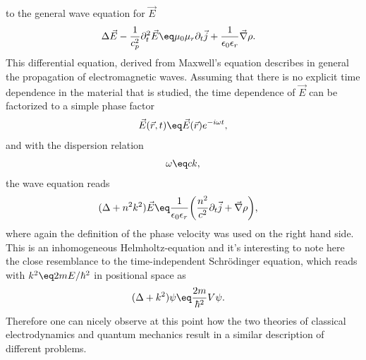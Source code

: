\documentclass[\main/dresen_thesis.tex]{subfiles}
\begin{document}
    to the general wave equation for $\vec{E}$
    \begin{align}
      \Delta \vec{E} - \frac{1}{c_p^2}\partial_t^2  \vec{E} \eq& \mu_0 \mu_r \partial_t \vec{j} + \frac{1}{\epsilon_0 \epsilon_r}\vec{\nabla} \rho.
    \end{align}
    This differential equation, derived from Maxwell's equation describes in general the propagation of electromagnetic waves.
    Assuming that there is no explicit time dependence in the material that is studied, the time dependence of $\vec{E}$ can be factorized to a simple phase factor
    \begin{align}
      \vec{E}(\vec{r}, t) \eq \vec{E} (\vec{r}) e^{-i\omega t},
    \end{align}
    and with the dispersion relation
    \begin{align}
      \omega \eq c k,
    \end{align}
    the wave equation reads
    \begin{align}
      (\Delta + n^2 k^2 )\vec{E} \eq& \frac{1}{\epsilon_0 \epsilon_r} \biggl(  \frac{n^2}{c^2} \partial_t \vec{j} + \vec{\nabla} \rho \biggr),
    \end{align}
    where again the definition of the phase velocity was used on the right hand side. This is an inhomogeneous Helmholtz-equation and it's interesting to note here the close resemblance to the time-independent Schr\"odinger equation, which reads with $k^2 \eq 2mE/\hbar^2$ in positional space as
    \begin{align}
      (\Delta + k^2 )\psi \eq& \frac{2m}{\hbar^2} V \psi.
    \end{align}
    Therefore one can nicely observe at this point how the two theories of classical electrodynamics and quantum mechanics result in a similar description of different problems.
\end{document}
